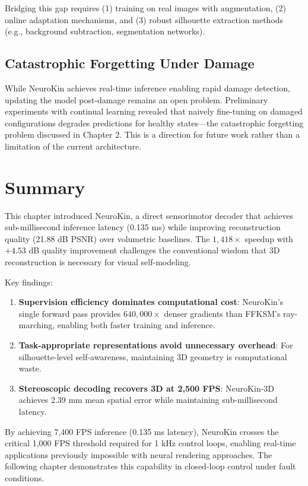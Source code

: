 \documentclass[12pt,a4paper,oneside]{report}
\begin{document}
Bridging this gap requires (1) training on real images with augmentation, (2) online adaptation mechanisms, and (3) robust silhouette extraction methods (e.g., background subtraction, segmentation networks).

\subsection{Catastrophic Forgetting Under Damage}

While NeuroKin achieves real-time inference enabling rapid damage detection, updating the model post-damage remains an open problem. Preliminary experiments with continual learning revealed that naively fine-tuning on damaged configurations degrades predictions for healthy states—the catastrophic forgetting problem discussed in Chapter 2. This is a direction for future work rather than a limitation of the current architecture.

\section{Summary}

This chapter introduced NeuroKin, a direct sensorimotor decoder that achieves sub-millisecond inference latency (0.135 ms) while improving reconstruction quality (21.88 dB PSNR) over volumetric baselines. The $1,418\times$ speedup with $+4.53$ dB quality improvement challenges the conventional wisdom that 3D reconstruction is necessary for visual self-modeling.

Key findings:

\begin{enumerate}
    \item \textbf{Supervision efficiency dominates computational cost}: NeuroKin's single forward pass provides $640,000\times$ denser gradients than FFKSM's ray-marching, enabling both faster training and inference.
    \item \textbf{Task-appropriate representations avoid unnecessary overhead}: For silhouette-level self-awareness, maintaining 3D geometry is computational waste.
    \item \textbf{Stereoscopic decoding recovers 3D at 2,500 FPS}: NeuroKin-3D achieves 2.39 mm mean spatial error while maintaining sub-millisecond latency.
\end{enumerate}

By achieving 7,400 FPS inference (0.135 ms latency), NeuroKin crosses the critical 1,000 FPS threshold required for 1 kHz control loops, enabling real-time applications previously impossible with neural rendering approaches. The following chapter demonstrates this capability in closed-loop control under fault conditions.
\end{document}

